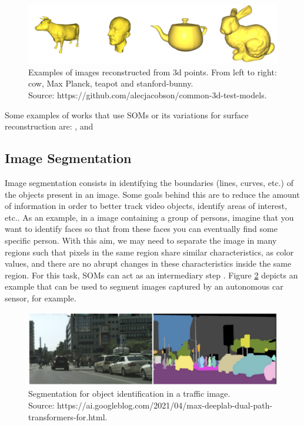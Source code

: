 \begin{figure}[!h]
\centering
\includegraphics[scale=0.35]{"Part 3 - Learning Systems/Unsupervised Learning/Self-Organizing Maps/figs/reconstruction.pdf"}
\caption{Examples of images reconstructed from 3d points. From left to right: cow, Max Planck, teapot and stanford-bunny. \\Source: https://github.com/alecjacobson/common-3d-test-models.}
\label{fig:reconstruction}
\end{figure}

Some examples of works that use SOMs or its variations for surface reconstruction are: \cite{Yu99surfacereconstruction}, \cite{1380023} and \cite{4371248}

\subsection{Image Segmentation}

Image segmentation consists in identifying the boundaries (lines, curves, etc.) of the objects present in an image. Some goals behind this are to reduce the amount of information in order to better track video objects, identify areas of interest, etc.. As an example, in a image containing a group of persons, imagine that you want to identify faces so that from these faces you can eventually find some specific person. With this aim, we may need to separate the image in many regions such that pixels in the same region share similar characteristics, as color values, and there are no abrupt changes in these characteristics inside the same region. For this task, SOMs can act as an intermediary step \cite{somImSeg1}\cite{somImSeg2}\cite{somImSeg3}\cite{somImSeg4}. Figure \ref{fig:imgSeg} depicts an example that can be used to segment images captured by an autonomous car sensor, for example. 


\begin{figure}[!h]
\centering
\includegraphics[scale=0.55]{ "Part 3 - Learning Systems/Unsupervised Learning/Self-Organizing Maps/figs/imageSeg.pdf"}
\caption{Segmentation for object identification in a traffic image.\\ Source: https://ai.googleblog.com/2021/04/max-deeplab-dual-path-transformers-for.html. }
\label{fig:imgSeg}
\end{figure}


